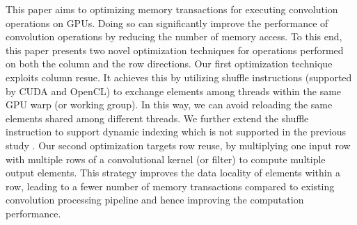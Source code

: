
This paper aims to optimizing memory transactions for executing convolution operations on GPUs. Doing so can
significantly improve the performance of convolution operations by reducing the number of memory access.  To this end,
this paper presents two novel optimization techniques for operations performed on both the column and the row
directions. Our first optimization technique exploits column resue. It achieves this by utilizing shuffle instructions
(supported by CUDA and OpenCL) to exchange elements among threads within the same GPU warp (or working group). In this
way, we can avoid reloading the same elements shared among different threads. We further extend the shuffle instruction
to support dynamic indexing which is not supported in the previous study \cite{vasilache2014fast}.  Our second
optimization targets row reuse, by multiplying one input row with multiple rows of a convolutional kernel (or filter)
to compute multiple output elements. This strategy improves the data locality of elements within a row, leading to a
fewer number of memory transactions compared to existing convolution processing pipeline and hence improving the
computation performance.



